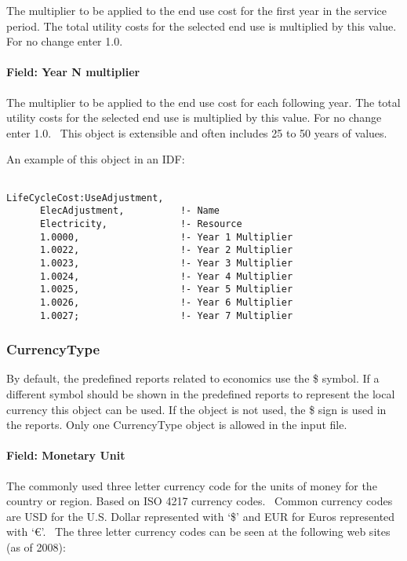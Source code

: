 The multiplier to be applied to the end use cost for the first year in the service period. The total utility costs for the selected end use is multiplied by this value. For no change enter 1.0.

\paragraph{Field: Year N multiplier}\label{field-year-n-multiplier}

The multiplier to be applied to the end use cost for each following year. The total utility costs for the selected end use is multiplied by this value. For no change enter 1.0.~ This object is extensible and often includes 25 to 50 years of values.

An example of this object in an IDF:

\begin{lstlisting}

LifeCycleCost:UseAdjustment,
      ElecAdjustment,          !- Name
      Electricity,             !- Resource
      1.0000,                  !- Year 1 Multiplier
      1.0022,                  !- Year 2 Multiplier
      1.0023,                  !- Year 3 Multiplier
      1.0024,                  !- Year 4 Multiplier
      1.0025,                  !- Year 5 Multiplier
      1.0026,                  !- Year 6 Multiplier
      1.0027;                  !- Year 7 Multiplier
\end{lstlisting}

\subsubsection{CurrencyType}\label{currencytype}

By default, the predefined reports related to economics use the \$ symbol. If a different symbol should be shown in the predefined reports to represent the local currency this object can be used. If the object is not used, the \$ sign is used in the reports. Only one CurrencyType object is allowed in the input file.

\paragraph{Field: Monetary Unit}\label{field-monetary-unit}

The commonly used three letter currency code for the units of money for the country or region. Based on ISO 4217 currency codes.~ Common currency codes are USD for the U.S. Dollar represented with `\$' and EUR for Euros represented with `\euro{}'.~ The three letter currency codes can be seen at the following web sites (as of 2008):

